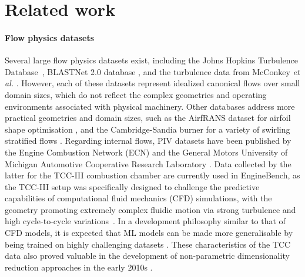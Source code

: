 \documentclass{article}
\begin{document}
\section{Related work}
\label{sec:litrev}
\paragraph{Flow physics datasets}
Several large flow physics datasets exist, including the Johns Hopkins Turbulence Database~\cite{li2008public}, BLASTNet 2.0 database \cite{chung2024turbulence}, and the turbulence data from McConkey \textit{et al.} \cite{mcconkey2021curated}. However, each of these datasets represent idealized canonical flows over small domain sizes, which do not reflect the complex geometries and operating environments associated with physical machinery. Other databases address more practical geometries and domain sizes, such as the AirfRANS dataset for airfoil shape optimisation \cite{bonnet2022airfrans}, and the Cambridge-Sandia burner for a variety of swirling stratified flows \cite{zhou2013flow}. Regarding internal flows, PIV datasets have been published by the Engine Combustion Network (ECN) \cite{meijer2012engine} and the General Motors University of Michigan Automotive Cooperative Research Laboratory \cite{Schiffmann2018}. Data collected by the latter for the TCC-III combustion chamber are currently used in EngineBench, as the TCC-III setup was specifically designed to challenge the predictive capabilities of computational fluid mechanics (CFD) simulations, with the geometry promoting extremely complex fluidic motion via strong turbulence and high cycle-to-cycle variations~\cite{schiffmann2016tcc}. In a development philosophy similar to that of CFD models, it is expected that ML models can be made more generalisable by being trained on highly challenging datasets \cite{ko2021methodology}. These characteristics of the TCC data also proved valuable in the development of non-parametric dimensionality reduction approaches in the early 2010s \cite{chen2012use,chen2013practical}. 
\end{document}
